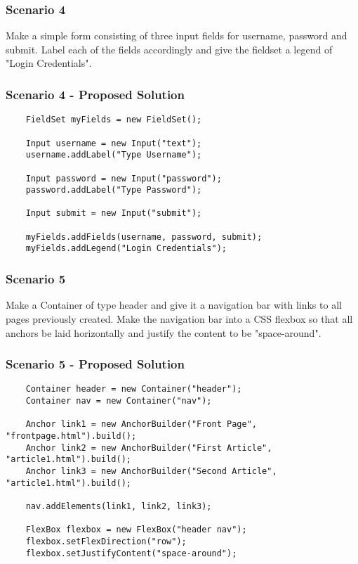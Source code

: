 \documentclass[12pt]{article}
\begin{document}
\subsubsection{Scenario 4}
Make a simple form consisting of three input fields for username, password and submit. Label each of the fields accordingly and give the fieldset a legend of "Login Credentials".

\subsubsection{Scenario 4 - Proposed Solution}

\begin{lstlisting}
    FieldSet myFields = new FieldSet();

    Input username = new Input("text");
    username.addLabel("Type Username");
    
    Input password = new Input("password");
    password.addLabel("Type Password");
    
    Input submit = new Input("submit");

    myFields.addFields(username, password, submit);
    myFields.addLegend("Login Credentials");
\end{lstlisting}

\subsubsection{Scenario 5}
Make a Container of type header and give it a navigation bar with links to all pages previously created. Make the navigation bar into a CSS flexbox so that all anchors be laid horizontally and justify the content to be "space-around".

\subsubsection{Scenario 5 - Proposed Solution}

\begin{lstlisting}
    Container header = new Container("header");
    Container nav = new Container("nav");

    Anchor link1 = new AnchorBuilder("Front Page", "frontpage.html").build();
    Anchor link2 = new AnchorBuilder("First Article", "article1.html").build();
    Anchor link3 = new AnchorBuilder("Second Article", "article1.html").build();

    nav.addElements(link1, link2, link3);

    FlexBox flexbox = new FlexBox("header nav");
    flexbox.setFlexDirection("row");
    flexbox.setJustifyContent("space-around");
\end{lstlisting}
\end{document}
